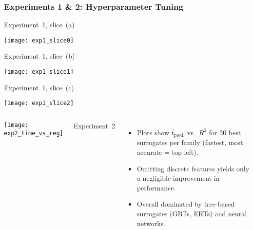 \begin{frame}
	\frametitle{Experiments 1 \& 2: Hyperparameter Tuning}

	\begin{minipage}{0.32\textwidth}
		\begin{center}
			\footnotesize
			\hspace{5pt} Experiment~1, slice~(a)
			\vspace{-10pt}
		\end{center}
		\texttt{[image: exp1\_slice0]}
	\end{minipage}
	\begin{minipage}{0.32\textwidth}
		\begin{center}
			\footnotesize
			\hspace{5pt} Experiment~1, slice~(b)
			\vspace{-10pt}
		\end{center}
		\texttt{[image: exp1\_slice1]}
	\end{minipage}
	\begin{minipage}{0.32\textwidth}
		\begin{center}
			\footnotesize
			\hspace{5pt} Experiment~1, slice~(c)
			\vspace{-10pt}
		\end{center}
		\texttt{[image: exp1\_slice2]}
	\end{minipage}

	\begin{columns}
		\texttt{[image: exp2\_time\_vs\_reg]}
		\begin{center}
			\footnotesize
			\vspace{-10pt}
			\hspace{20pt} Experiment~2
		\end{center}

		\begin{itemize}
			\item
				Plots show $\overline{t}_\text{pred.}$ vs.~$R^2$ for 20 best surrogates per family (fastest, most
				accurate = top left).
			\item
				Omitting discrete features yields only a negligible
				improvement in performance.
			\item
				Overall dominated by tree-based surrogates (GBTs, ERTs) and
				neural networks.
		\end{itemize}
	\end{columns}

\end{frame}


